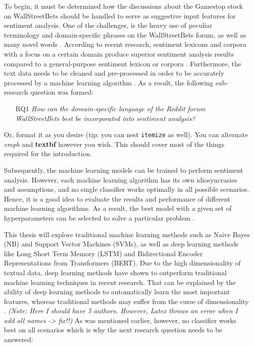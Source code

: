 \documentclass[11pt, a4paper]{article}
\begin{document}
\noindent
To begin, it must be determined how the discussions about the Gamestop stock on WallStreetBets should be handled to serve as suggestive input features for sentiment analysis. 
One of the challenges, is the heavy use of peculiar terminology and domain-specific phrases on the WallStreetBets forum, as well as many novel words \citep{anand2021WallstreetbetsAgainstWallstreet}. 
According to recent research, sentiment lexicons and corpora with a focus on a certain domain produce superior sentiment analysis results compared to a 
general-purpose sentiment lexicon or corpora \citep{park2015EfficientExtractionOfDomain}. Furthermore, the text data needs to be cleaned and pre-processed in order to be accurately 
processed by a machine learning algorithm \citep{jemai2021SentimentAnalysis}. As a result, the following sub-research question was formed:

\begin{itemize}
    \item[RQ1] \emph{How can the domain-specific language of the Reddit forum WallStreetBets best be incorporated into sentiment analysis?}
\end{itemize}

\noindent Or, format it as you desire (tip: you can nest \texttt{itemize} as well). You can alternate \emph{emph} and \textbf{textbf} however you wish. This should cover most of the things required for the introduction.

Subsequently, the machine learning models can be trained to perform sentiment analysis. However, 
each machine learning algorithm has its own idiosyncrasies and assumptions, and no single classifier 
works optimally in all possible scenarios. Hence, it is a good idea to evaluate the results and 
performance of different machine learning algorithms. As a result, the best model with a given set 
of hyperparameters can be selected to solve a particular problem \citep[p. 53]{raschka2019pythonmachinelearning}. 

This thesis will explore traditional machine learning methods such as Naive Bayes (NB) 
and Support Vector Machines (SVMs), as well as deep learning methods like 
Long Short Term Memory (LSTM) and Bidirectional Encoder Representations from 
Transformers (BERT). Due to the high dimensionality of textual data, deep learning methods have shown 
to outperform traditional machine learning techniques in recent research. That can be explained by the 
ability of deep learning methods to automatically learn the most important features, whereas traditional 
methods may suffer from the curse of dimensionality \citep{fu2018lexiconenhancedlstm}. \emph{(Note: Here I should have 5 authors. However, Latex throws an error when I add all names -> fix!!)}
As was mentioned earlier, however, no classifier works best on all scenarios which is why the next research question needs to be answered:
\end{document}
